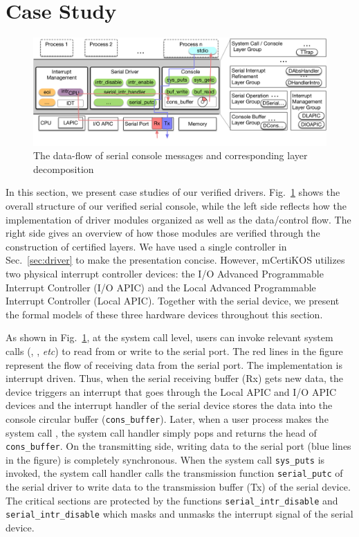 \section{Case Study}
\label{sec:case_study}

\begin{figure}
	\begin{center}
		\includegraphics[scale=0.35]{figs/data_flow}
	\end{center}
	\caption{The data-flow of serial console messages and corresponding layer decomposition}
	\label{fig:data-flow}
\end{figure}


In this section, we present case studies of our verified drivers.
Fig.~\ref{fig:data-flow} shows the overall structure of our verified serial
console, while the left side reflects how the implementation of driver modules
organized as well as the data/control flow. The right side gives an overview
of how those modules are verified through the construction of certified layers. We have
used a single controller in Sec.~\ref{sec:driver} to make the presentation
concise. However, mCertiKOS utilizes two physical interrupt controller devices:
the I/O Advanced Programmable Interrupt Controller (I/O APIC) and the Local
Advanced Programmable Interrupt Controller (Local APIC). Together with the
serial device, we present the formal models of these three hardware devices
throughout this section.

As shown in Fig.~\ref{fig:data-flow}, at the system call level, users can invoke
relevant system calls (, , {\it etc}) to read
from or write to the serial port. The red lines in the figure represent the
flow of receiving data from the serial port. The implementation is interrupt driven.
Thus, when the serial receiving buffer (Rx) gets new data, the device triggers
an interrupt that goes through the Local APIC and I/O APIC devices and the
interrupt handler of the serial device stores the data into the console circular
buffer (\texttt{cons\_buffer}). Later, when a user process makes the system call
, the system call handler simply pops and returns the head of
\texttt{cons\_buffer}. On the transmitting side, writing data to the serial port
(blue lines in the figure) is completely synchronous. When the system call
\texttt{sys\_puts} is invoked, the system call handler calls the transmission
function \texttt{serial\_putc} of the serial driver to write data to the
transmission buffer (Tx) of the serial device. The critical sections are protected
by the functions \texttt{serial\_intr\_disable} and
\texttt{serial\_intr\_disable} which masks and unmasks the interrupt signal of
the serial device.

